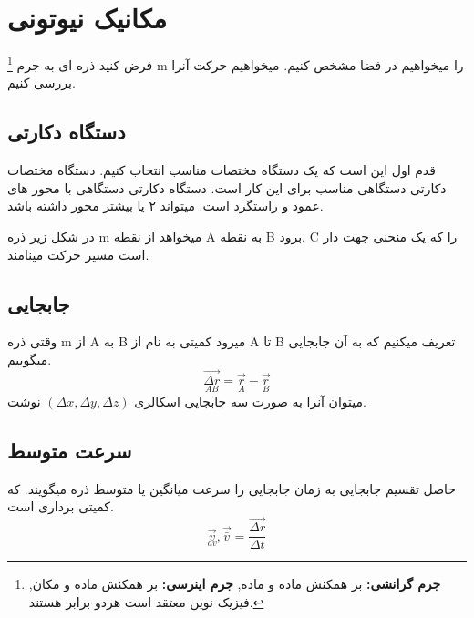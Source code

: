 \documentclass[12px, a4paper, oneside]{article}
\begin{document}
\section*{مکانیک نیوتونی}
\newcommand\deltavec[1]{\vec{\Delta{#1}}}
\newcommand\undersetrtl[2]{
${\underset{#1}{#2}}$
}
فرض کنید ذره ای به جرم
\footnote[1]{
    {\bf جرم گرانشی:}
    بر همکنش ماده و ماده,
    {\bf جرم اینرسی:}
    بر همکنش ماده و مکان, فیزیک نوین معتقد است هردو برابر هستند.
}
 m را میخواهیم در فضا مشخص کنیم.  میخواهیم حرکت آنرا بررسی کنیم. 
\subsection*{دستگاه دکارتی}
قدم اول این است که یک دستگاه مختصات مناسب انتخاب کنیم. دستگاه مختصات دکارتی دستگاهی مناسب برای این کار است.
دستگاه دکارتی دستگاهی با محور های عمود و راستگرد است. میتواند ۲ یا بیشتر محور داشته باشد.

در شکل زیر ذره m میخواهد از نقطه A به نقطه B برود. 
C را که یک منحنی جهت دار است مسیر حرکت مینامند.

\subsection*{جابجایی}
وقتی ذره m از A به B میرود کمیتی به نام از A تا B تعریف میکنیم که به آن جابجایی میگوییم.
\[ \underset{AB}{\deltavec{r}} = \vec{\underset{A}{r}} - \vec{\underset{B}{r}} \]
میتوان آنرا به صورت سه جابجایی اسکالری $
(\Delta{x},\Delta{y},\Delta{z}) $
نوشت.
\subsection*{سرعت متوسط}
حاصل تقسیم جابجایی به زمان جابجایی را سرعت میانگین یا متوسط ذره میگویند. که کمیتی برداری است.
\[ \vec{\underset{av}{v}} , \vec{\bar{v}} = \frac{\deltavec{r}}{\Delta{t}}\]
\end{document}
